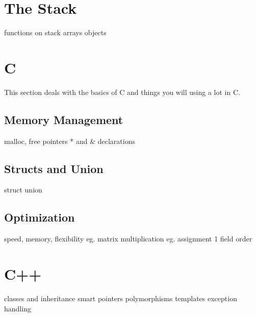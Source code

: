 \section{The Stack}
functions on stack
arrays
objects
\section{C}
This section deals with the basics of C and things you will using a lot in C.
\subsection{Memory Management}
malloc, free
pointers * and \&
declarations
\subsection{Structs and Union}
struct
union
\subsection{Optimization}
speed, memory, flexibility
eg. matrix multiplication
eg. assignment 1
field order
\section{C++}
classes and inheritance
smart pointers
polymorphisms
templates
exception handling